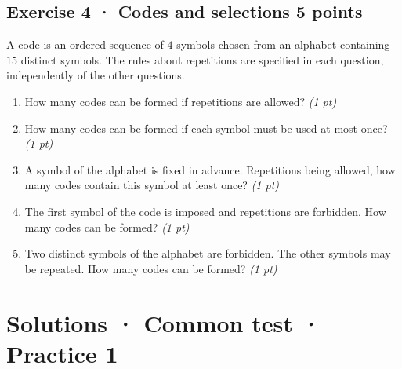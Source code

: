 \subsection*{Exercise 4 · Codes and selections \hfill 5 points}A code is an ordered sequence of $4$ symbols chosen from an alphabet containing $15$ distinct symbols. The rules about repetitions are specified in each question, independently of the other questions.

\begin{enumerate}

\item How many codes can be formed if repetitions are allowed? \hfill\textit{(1 pt)}

\item How many codes can be formed if each symbol must be used at most once? \hfill\textit{(1 pt)}

\item A symbol of the alphabet is fixed in advance. Repetitions being allowed, how many codes contain this symbol at least once? \hfill\textit{(1 pt)}

\item The first symbol of the code is imposed and repetitions are forbidden. How many codes can be formed? \hfill\textit{(1 pt)}

\item Two distinct symbols of the alphabet are forbidden. The other symbols may be repeated. How many codes can be formed? \hfill\textit{(1 pt)}

\end{enumerate}

\ifprof\clearpage

\section*{Solutions · Common test · Practice 1}\label{cor:3-1}

